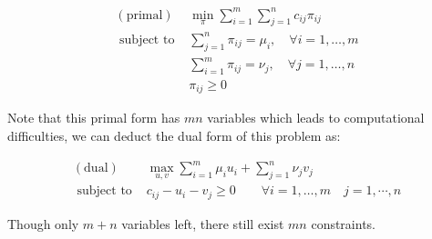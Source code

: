 \begin{equation}
  \begin{array}{rl}{\mathrm{(primal)}} & {\min_\pi \sum_{i=1}^{m} \sum_{j=1}^{n} c_{i j} \pi_{i j}} \\{\text { subject to }} & {\sum_{j=1}^{n} \pi_{i j}=\mu_{i},\quad \forall i=1, \ldots, m} \\{} & {\sum_{i=1}^{m} \pi_{i j}=\nu_{j},\quad \forall j=1, \ldots, n} \\{} & {\pi_{i j} \geq 0}\end{array}
\end{equation}

Note that this primal form has $mn$ variables which leads to computational difficulties, we can deduct the dual form of this problem as:

\begin{equation}
  \begin{array}{rl}{\mathrm{(dual)}} & {\max _{u, v} \sum_{i=1}^{m} \mu_{i} u_{i}+\sum_{j=1}^{n} \nu_{j} v_{j}} \\{\text { subject to }} & {c_{ij} - u_i - v_j \geq 0\qquad\forall i=1, \ldots, m \quad j = 1,\cdots,n}\end{array}
\end{equation}

Though only $m + n$ variables left, there still exist $mn$ constraints.